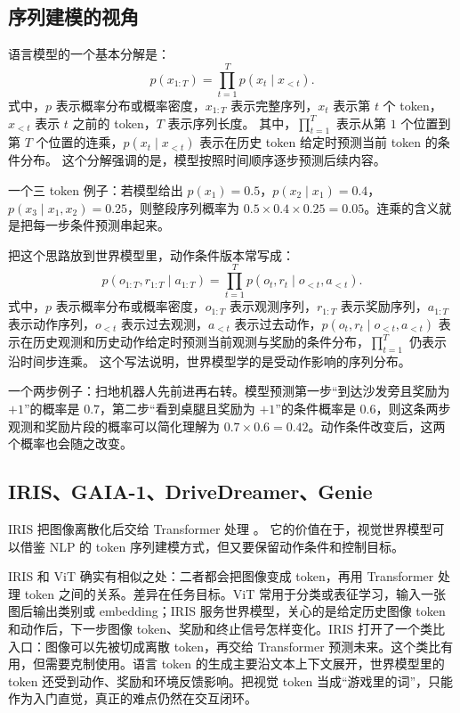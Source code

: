 \documentclass[11pt,a4paper]{ctexart}
\begin{document}
\subsection{序列建模的视角}

语言模型的一个基本分解是：
\begin{equation}
  p(x_{1:T}) = \prod_{t=1}^T p(x_t\mid x_{<t}).
\end{equation}
式中，$p$ 表示概率分布或概率密度，$x_{1:T}$ 表示完整序列，$x_t$ 表示第 $t$ 个 token，$x_{<t}$ 表示 $t$ 之前的 token，$T$ 表示序列长度。
其中，$\prod_{t=1}^T$ 表示从第 $1$ 个位置到第 $T$ 个位置的连乘，$p(x_t\mid x_{<t})$ 表示在历史 token 给定时预测当前 token 的条件分布。
这个分解强调的是，模型按照时间顺序逐步预测后续内容。

一个三 token 例子：若模型给出 $p(x_1)=0.5$，$p(x_2\mid x_1)=0.4$，$p(x_3\mid x_1,x_2)=0.25$，则整段序列概率为 $0.5\times0.4\times0.25=0.05$。连乘的含义就是把每一步条件预测串起来。

把这个思路放到世界模型里，动作条件版本常写成：
\begin{equation}
  p(o_{1:T}, r_{1:T}\mid a_{1:T})
  =
  \prod_{t=1}^T p(o_t, r_t\mid o_{<t}, a_{<t}).
\end{equation}
式中，$p$ 表示概率分布或概率密度，$o_{1:T}$ 表示观测序列，$r_{1:T}$ 表示奖励序列，$a_{1:T}$ 表示动作序列，$o_{<t}$ 表示过去观测，$a_{<t}$ 表示过去动作，$p(o_t,r_t\mid o_{<t},a_{<t})$ 表示在历史观测和历史动作给定时预测当前观测与奖励的条件分布，$\prod_{t=1}^T$ 仍表示沿时间步连乘。
这个写法说明，世界模型学的是受动作影响的序列分布。

一个两步例子：扫地机器人先前进再右转。模型预测第一步“到达沙发旁且奖励为 $+1$”的概率是 $0.7$，第二步“看到桌腿且奖励为 $+1$”的条件概率是 $0.6$，则这条两步观测和奖励片段的概率可以简化理解为 $0.7\times0.6=0.42$。动作条件改变后，这两个概率也会随之改变。

\subsection{IRIS、GAIA-1、DriveDreamer、Genie}

IRIS 把图像离散化后交给 Transformer 处理 \cite{micheli2022iris}。
它的价值在于，视觉世界模型可以借鉴 NLP 的 token 序列建模方式，但又要保留动作条件和控制目标。

IRIS 和 ViT 确实有相似之处：二者都会把图像变成 token，再用 Transformer 处理 token 之间的关系。差异在任务目标。ViT 常用于分类或表征学习，输入一张图后输出类别或 embedding；IRIS 服务世界模型，关心的是给定历史图像 token 和动作后，下一步图像 token、奖励和终止信号怎样变化。IRIS 打开了一个类比入口：图像可以先被切成离散 token，再交给 Transformer 预测未来。这个类比有用，但需要克制使用。语言 token 的生成主要沿文本上下文展开，世界模型里的 token 还受到动作、奖励和环境反馈影响。把视觉 token 当成“游戏里的词”，只能作为入门直觉，真正的难点仍然在交互闭环。
\end{document}

